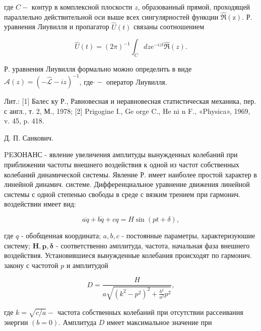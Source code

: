 \documentclass[10pt]{article}
\begin{document}
где $C-$ контур в комплексной плоскости $z$, образованный прямой, проходящей параллельно действительной оси выше всех сингулярностей функции $\hat{\Re}(\mathrm{z})$. Р. уравнения Лиувилля и пропагатор $\hat{U}(t)$ связаны соотношением



\[

\hat{U}(t)=(2 \pi)^{-1} \int_{C} d z e^{-i z t} \hat{\Re}(z) .

\]



Р. уравнения Лиувилля формально можно определить в виде $\hat{\mathscr{A}}(z)=(-\hat{\mathscr{L}}-i z)^{-1}$, где $\hat{\mathscr{\mathscr { }}}-$ оператор Лиувилля.



Лит.: [1] Балес ку Р., Равновесная и неравновесная статистическая механика, пер. с англ., т. 2, М., 1978; [2] Prigogine I., Ge orge C., He ni n F., «Physica», 1969, v. 45, p. 418.



Д. П. Санкович.



PEЗОНАНС - явление увеличения амплитуды вынужденных колебаний при приближении частоты внешнего воздействия к одной из частот собственных колебаний динамической системы. Явление Р. имеет наиболее простой характер в линейной динамич. системе. Дифференциальное уравнение движения линейной системы с одной степенью свободы в среде с вязким трением при гармонич. воздействии имеет вид:



\[

a \ddot{q}+b \dot{q}+c q=H \sin (p t+\delta),

\]



где $q$ - обобщенная координата; $a, b, c$ - постоянные параметры, характеризуюшие систему; $\boldsymbol{H}, \boldsymbol{p}, \boldsymbol{\delta}$ - соответственно амплитуда, частота, начальная фаза внешнего воздействия. Установившиеся вынужденные колебания происходят по гармонич. закону с частотой $p$ и амплитудой



\[

D=\frac{H}{a \sqrt{\left(k^{2}-p^{2}\right)^{2}+\frac{b^{2}}{a^{2}} p^{2}}},

\]



где $k=\sqrt{c / a}-$ частота собственных колебаний при отсутствии рассеивания энергии $(b=0)$. Амплитуда $D$ имеет максимальное значение при
\end{document}
